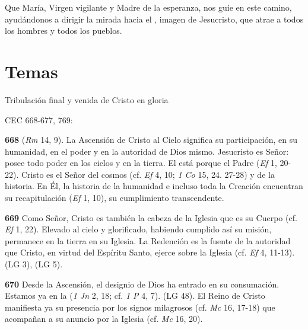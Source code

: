 Que María, Virgen vigilante y Madre de la esperanza, nos guíe en este camino, ayudándonos a dirigir la mirada hacia el , imagen de Jesucristo, que atrae a todos los hombres y todos los pueblos.


\section{Temas}

Tribulación final y venida de Cristo en gloria

CEC 668-677, 769:

\textbf{668}  (\emph{Rm} 14, 9). La Ascensión de Cristo al Cielo significa su participación, en su humanidad, en el poder y en la autoridad de Dios mismo. Jesucristo es Señor: posee todo poder en los cielos y en la tierra. El está  porque el Padre  (\emph{Ef} 1, 20-22). Cristo es el Señor del cosmos (cf. \emph{Ef} 4, 10; \emph{1 Co} 15, 24. 27-28) y de la historia. En Él, la historia de la humanidad e incluso toda la Creación encuentran su recapitulación (\emph{Ef} 1, 10), su cumplimiento transcendente.

\textbf{669} Como Señor, Cristo es también la cabeza de la Iglesia que es su Cuerpo (cf. \emph{Ef} 1, 22). Elevado al cielo y glorificado, habiendo cumplido así su misión, permanece en la tierra en su Iglesia. La Redención es la fuente de la autoridad que Cristo, en virtud del Espíritu Santo, ejerce sobre la Iglesia (cf. \emph{Ef} 4, 11-13).  (LG 3),  (LG 5).

\textbf{670} Desde la Ascensión, el designio de Dios ha entrado en su consumación. Estamos ya en la  (\emph{1 Jn} 2, 18; cf. \emph{1 P} 4, 7).  (LG 48). El Reino de Cristo manifiesta ya su presencia por los signos milagrosos (cf. \emph{Mc} 16, 17-18) que acompañan a su anuncio por la Iglesia (cf. \emph{Mc} 16, 20).

